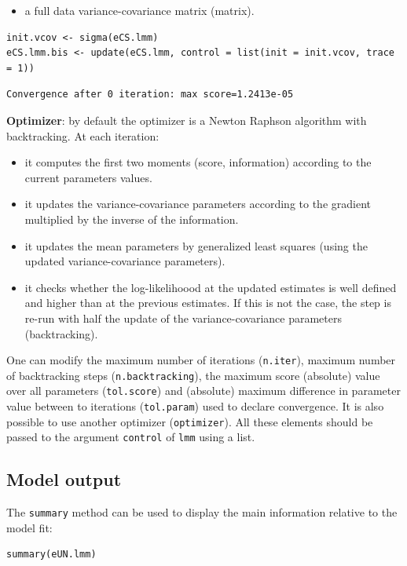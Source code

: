 \documentclass[12pt]{article}
\begin{document}
\begin{itemize}
\item a full data variance-covariance matrix (matrix).
\end{itemize}
\lstset{language=r,label= ,caption= ,captionpos=b,numbers=none}
\begin{lstlisting}
init.vcov <- sigma(eCS.lmm)
eCS.lmm.bis <- update(eCS.lmm, control = list(init = init.vcov, trace = 1))
\end{lstlisting}

\begin{verbatim}
Convergence after 0 iteration: max score=1.2413e-05
\end{verbatim}


\textbf{Optimizer}: by default the optimizer is a Newton Raphson algorithm
with backtracking. At each iteration:
\begin{itemize}
\item it computes the first two moments (score, information) according to
the current parameters values.
\item it updates the variance-covariance parameters according to the
gradient multiplied by the inverse of the information.
\item it updates the mean parameters by generalized least squares (using
the updated variance-covariance parameters).
\item it checks whether the log-likelihoood at the updated estimates is
well defined and higher than at the previous estimates. If this is
not the case, the step is re-run with half the update of the
variance-covariance parameters (backtracking).
\end{itemize}

One can modify the maximum number of iterations (\texttt{n.iter}), maximum
number of backtracking steps (\texttt{n.backtracking}), the maximum score
(absolute) value over all parameters (\texttt{tol.score}) and (absolute)
maximum difference in parameter value between to iterations
(\texttt{tol.param}) used to declare convergence. It is also possible to use
another optimizer (\texttt{optimizer}). All these elements should be passed
to the argument \texttt{control} of \texttt{lmm} using a list.

\clearpage

\subsection{Model output}
\label{sec:org900cd46}

The \texttt{summary} method can be used to display the main information
relative to the model fit:
\lstset{language=r,label= ,caption= ,captionpos=b,numbers=none}
\begin{lstlisting}
summary(eUN.lmm)
\end{lstlisting}
\end{document}

